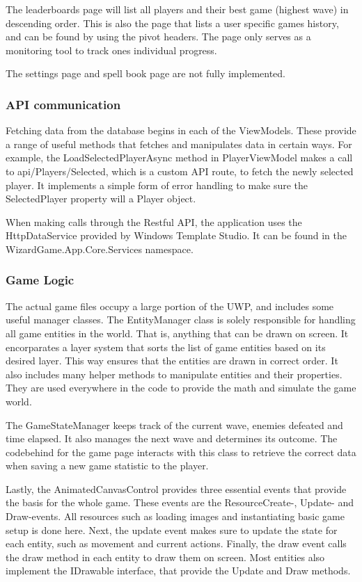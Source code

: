 \documentclass[12pt]{article}
\begin{document}
        The leaderboards page will list all players and their best game (highest wave) in descending order. This is also the page that lists a user specific games history, and can be found by using the pivot headers. The page only serves as a monitoring tool to track ones individual progress.
        
        The settings page and spell book page are not fully implemented.

        \subsubsection{API communication}

        Fetching data from the database begins in each of the ViewModels. These provide a range of useful methods that fetches and manipulates data in certain ways. For example, the LoadSelectedPlayerAsync method in PlayerViewModel makes a call to api/Players/Selected, which is a custom API route, to fetch the newly selected player. It implements a simple form of error handling to make sure the SelectedPlayer property will a Player object.

        When making calls through the Restful API, the application uses the HttpDataService provided by Windows Template Studio. It can be found in the WizardGame.App.Core.Services namespace.

        \subsubsection{Game Logic}

        The actual game files occupy a large portion of the UWP, and includes some useful manager classes. The EntityManager class is solely responsible for handling all game entities in the world. That is, anything that can be drawn on screen. It encorparates a layer system that sorts the list of game entities based on its desired layer. This way ensures that the entities are drawn in correct order. It also includes many helper methods to manipulate entities and their properties. They are used everywhere in the code to provide the math and simulate the game world.

        The GameStateManager keeps track of the current wave, enemies defeated and time elapsed. It also manages the next wave and determines its outcome. The codebehind for the game page interacts with this class to retrieve the correct data when saving a new game statistic to the player.

        Lastly, the AnimatedCanvasControl provides three essential events that provide the basis for the whole game. These events are the ResourceCreate-, Update- and Draw-events. All resources such as loading images and instantiating basic game setup is done here. Next, the update event makes sure to update the state for each entity, such as movement and current actions. Finally, the draw event calls the draw method in each entity to draw them on screen. Most entities also implement the IDrawable interface, that provide the Update and Draw methods.
\end{document}
